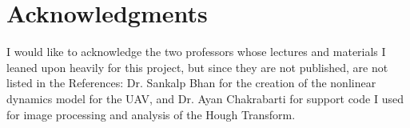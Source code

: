 \documentclass[10pt,twocolumn,letterpaper]{article}
\begin{document}
	\section*{Acknowledgments}
	I would like to acknowledge the two professors whose lectures and materials I leaned upon heavily for this project, but since they are not published, are not listed in the References: Dr. Sankalp Bhan for the creation of the nonlinear dynamics model for the UAV, and Dr. Ayan Chakrabarti for support code I used for image processing and analysis of the Hough Transform. 
	

	
	{\small
		
	}
	
\end{document}
